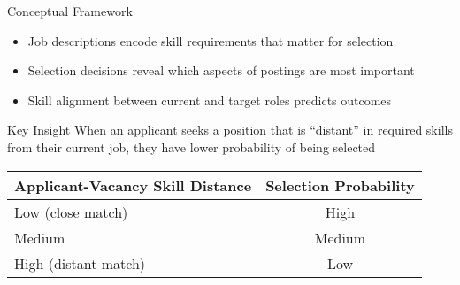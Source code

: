 \documentclass{beamer}
\begin{document}
\begin{frame}{Conceptual Framework}
\begin{itemize}
    \item Job descriptions encode skill requirements that matter for selection
    \item Selection decisions reveal which aspects of postings are most important
    \item Skill alignment between current and target roles predicts outcomes
\end{itemize}

\begin{block}{Key Insight}
When an applicant seeks a position that is ``distant'' in required skills from their current job, they have lower probability of being selected
\end{block}

\begin{table}
\centering
\begin{tabular}{l c}
\toprule
\textbf{Applicant-Vacancy Skill Distance} & \textbf{Selection Probability} \\
\midrule
Low (close match) & High \\
Medium & Medium \\
High (distant match) & Low \\
\bottomrule
\end{tabular}
\end{table}
\end{frame}
\end{document}
